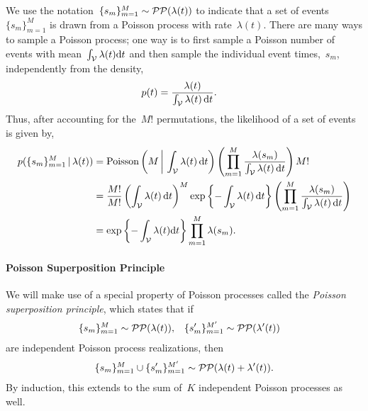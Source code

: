 We use the notation~${\{s_m\}_{m=1}^M\sim\mathcal{PP}(\lambda(t))}$ to indicate
that a set of events~$\{s_m\}_{m=1}^M$ is drawn from a Poisson process
with rate~$\lambda(t)$. There are many ways to sample a Poisson
process; one way is to first sample a Poisson number of events with
mean~${\int_{\mathcal{V}} \lambda(t) \mathrm{d}t}$ and then sample the individual
event times,~$s_m$, independently from the density,
\begin{align*}
  p(t) &= \frac{\lambda(t)}{\int_{\mathcal{V}} \lambda(t) \, \mathrm{d}t}.
\end{align*}
Thus, after accounting for the~$M!$ permutations,
the likelihood of a set of events is given by,
\begin{align}
  \nonumber
  p(\{s_m\}_{m=1}^M \,|\, \lambda(t))
  &= \mathrm{Poisson} \left(M \, \bigg| \, \int_{\mathcal{V}} \lambda(t) \, \mathrm{d} t \right)
  \left( \prod_{m=1}^M \frac{\lambda(s_m)}{\int_{\mathcal{V}} \lambda(t) \, \mathrm{d}t} \right)  M! \\
  \nonumber
  &= \frac{M!}{M!} \left(\int_{\mathcal{V}} \lambda(t) \, \mathrm{d} t \right)^M
  \exp \left \{-\int_{\mathcal{V}} \lambda(t) \, \mathrm{d} t \right \} 
  \left( \prod_{m=1}^M \frac{\lambda(s_m)}{\int_{\mathcal{V}} \lambda(t) \, \mathrm{d}t} \right) \\
  \label{eq:poisson_lkhd}
  &=\exp\left\{-\int_{\mathcal{V}}\lambda(t)\mathrm{d}t \right\}
  \prod_{m=1}^M\lambda(s_m).
\end{align}

\paragraph{Poisson Superposition Principle}
We will make use of a special property of Poisson processes called the
\emph{Poisson superposition principle}, which states that if
\begin{align*}
  \{s_{m}\}_{m=1}^{M} &\sim \mathcal{PP}(\lambda(t)), & 
  \{s'_{m}\}_{m=1}^{M'} &\sim \mathcal{PP}(\lambda'(t))
\end{align*}
are independent Poisson process realizations, then
\begin{align*}
\{s_{m}\}_{m=1}^{M} \cup \{s'_{m}\}_{m=1}^{M'} \sim \mathcal{PP}(\lambda(t)+\lambda'(t)).
\end{align*}
By induction, this extends to the sum of~$K$ independent Poisson
processes as well.

